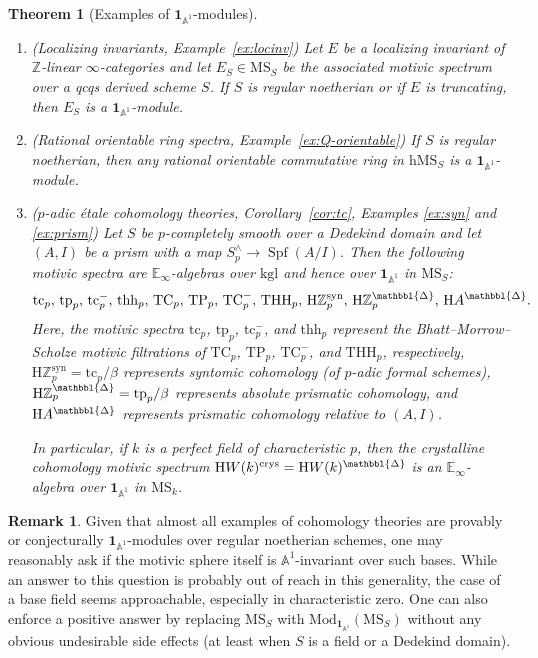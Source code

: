 \documentclass{amsart}
\numberwithin{equation}{section}
\theoremstyle{plain}
\newtheorem{theorem}[equation]{Theorem}
\theoremstyle{definition}
\newtheorem{remark}[equation]{Remark}
\let\bb=\mathbb
\def\Z{\bb Z}
\def\A{\bb A}
\def\1{\mathbf 1}
\def\h{\mathrm h}
\DeclareMathOperator{\Spf}{Spf}
\def\HH{\mathrm{H}}
\def\E{\mathbb{E}}
\def\THH{\mathrm{THH}}
\let\cat=\mathrm
\def\Mod{\cat{M}\mathrm{od}{}}
\def\MS{\mathrm{MS}}
\newcommand{\TC}{\mathrm{TC}}
\newcommand{\TP}{\mathrm{TP}}
\newcommand{\crys}{\mathrm{crys}}
\newcommand{\kgl}{\mathrm{kgl}}
\newcommand{\syn}{\mathrm{syn}}
\newcommand{\tc}{\mathrm{tc}}
\newcommand{\tp}{\mathrm{tp}}
\newcommand{\thh}{\mathrm{thh}}
\newcommand{\prism}{{\mathbbl{\Delta}}}
\begin{document}
\begin{theorem}[Examples of $\1_{\A^1}$-modules]
	\label{thm:intro-A1-modules}
	\leavevmode
	\begin{enumerate}
		\item \textnormal{(Localizing invariants, Example~\ref{ex:locinv})} Let $E$ be a localizing invariant of $\Z$-linear $\infty$-categories and let $E_S\in \MS_S$ be the associated motivic spectrum over a qcqs derived scheme $S$. If $S$ is regular noetherian or if $E$ is truncating, then $E_S$ is a $\1_{\A^1}$-module.
		\item \textnormal{(Rational orientable ring spectra, Example~\ref{ex:Q-orientable})} If $S$ is regular noetherian, then any rational orientable commutative ring in $\h\MS_S$ is a $\1_{\A^1}$-module.
		\item \textnormal{($p$-adic étale cohomology theories, Corollary~\ref{cor:tc}, Examples \ref{ex:syn} and \ref{ex:prism})} Let $S$ be $p$-completely smooth over a Dedekind domain and let $(A,I)$ be a prism with a map $S^\wedge_p\to\Spf(A/I)$. Then the following motivic spectra are $\E_\infty$-algebras over $\kgl$ and hence over $\1_{\A^1}$ in $\MS_S$:
		\[
		\tc_p,\,\tp_p,\,\tc_p^-,\,\thh_p,\,
		\TC_p,\,\TP_p,\,\TC_p^-,\,\THH_p,\,
		\HH\Z_p^\syn,\,\HH\Z_p^\prism,\, \HH A^\prism.
		\]
		Here, the motivic spectra $\tc_p$, $\tp_p$, $\tc_p^-$, and $\thh_p$ represent the Bhatt–Morrow–Scholze motivic filtrations of $\TC_p$, $\TP_p$, $\TC_p^-$, and $\THH_p$, respectively, $\HH\Z_p^\syn=\tc_p/\beta$ represents syntomic cohomology (of $p$-adic formal schemes), $\HH\Z_p^\prism=\tp_p/\beta$ represents absolute prismatic cohomology, and $\HH A^\prism$ represents prismatic cohomology relative to $(A,I)$.
		
		In particular, if $k$ is a perfect field of characteristic $p$, then the crystalline cohomology motivic spectrum $\HH W(k)^\crys=\HH W(k)^\prism$ is an $\E_\infty$-algebra over $\1_{\A^1}$ in $\MS_k$.
	\end{enumerate}
\end{theorem}

\begin{remark}\label{rmk:1=1A1}
	Given that almost all examples of cohomology theories are provably or conjecturally $\1_{\A^1}$-modules over regular noetherian schemes, one may reasonably ask if the motivic sphere itself is $\A^1$-invariant over such bases.
	While an answer to this question is probably out of reach in this generality, the case of a base field seems approachable, especially in characteristic zero.
	One can also enforce a positive answer by replacing $\MS_S$ with $\Mod_{\1_{\A^1}}(\MS_S)$ without any obvious undesirable side effects (at least when $S$ is a field or a Dedekind domain).
\end{remark}
\end{document}
